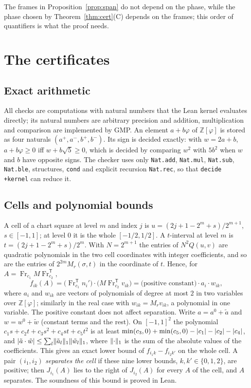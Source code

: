 \documentclass[11pt]{article}
\theoremstyle{definition}
\theoremstyle{remark}
\newcommand{\Z}{\mathbb{Z}}
\newcommand{\Fr}{\operatorname{Fr}}
\newcommand{\T}{\mathsf T}
\DeclarePairedDelimiter{\abs}{\lvert}{\rvert}
\DeclarePairedDelimiter{\norm}{\lVert}{\rVert}
\begin{document}
The frames in Proposition~\ref{prop:span} do not depend on the phase, while the phase chosen by
Theorem~\ref{thm:cert}(C) depends on the frames; this order of quantifiers is what the proof needs.

\section{The certificates}\label{sec:cert}

\subsection{Exact arithmetic}
All checks are computations with natural numbers that the Lean kernel evaluates directly; its
natural numbers are arbitrary precision and addition, multiplication and comparison are
implemented by GMP. An element $a+b\varphi$ of $\Z[\varphi]$ is stored as four naturals
$(a^+,a^-,b^+,b^-)$. Its sign is decided exactly: with $w=2a+b$, $a+b\varphi\ge0$ iff
$w+b\sqrt5\ge0$, which is decided by comparing $w^2$ with $5b^2$ when $w$ and $b$ have
opposite signs. The checker uses only \texttt{Nat.add}, \texttt{Nat.mul}, \texttt{Nat.sub},
\texttt{Nat.ble}, structures, \texttt{cond} and explicit recursion \texttt{Nat.rec}, so that
\texttt{decide +kernel} can reduce it.

\subsection{Cells and polynomial bounds}
A cell of a chart square at level $m$ and index $j$ is $u=(2j+1-2^m+s)/2^{m+1}$, $s\in[-1,1]$; at level
$0$ it is the whole $[-1/2,1/2]$. A $t$-interval at level $m$ is $t=(2j+1-2^m+s)/2^m$. With
$N=2^{m+1}$ the entries of $N^2Q(u,v)$ are quadratic polynomials in the two cell coordinates with
integer coefficients, and so are the entries of $2^{2m}M_r(\sigma,t)$ in the coordinate of $t$. Hence,
for $A=\Fr_{c_1}M\Fr_{c_2}^{\T}$,
\[
  f_{ik}(A)=\bigl(\Fr_{c_1}^{\T}n_i'\bigr)\cdot\bigl(M\Fr_{c_2}^{\T}v_{ik}\bigr)
  =\text{(positive constant)}\cdot a_i\cdot w_{ik},
\]
where $a_i$ and $w_{ik}$ are vectors of polynomials of degree at most $2$ in two variables over
$\Z[\varphi]$; similarly in the real case with $w_{ik}=M_rv_{ik}$, a polynomial in one variable. The
positive constant does not affect separation. Write $a=a^0+\tilde a$ and $w=w^0+\tilde w$ (constant
terms and the rest). On $[-1,1]^2$ the polynomial $c_1s+c_2t+c_3s^2+c_4st+c_5t^2$ is at least
$\min(c_3,0)+\min(c_5,0)-\abs{c_1}-\abs{c_2}-\abs{c_4}$, and
$\abs{\tilde a\cdot\tilde w}\le\sum_{l}\norm{\tilde a_l}_1\norm{\tilde w_l}_1$, where
$\norm{\cdot}_1$ is the sum of the absolute values of the coefficients. This gives an exact lower
bound of $f_{i_1k}-f_{i_2k'}$ on the whole cell. A pair $(i_1,i_2)$ \emph{separates the cell} if these
nine lower bounds, $k,k'\in\{0,1,2\}$, are positive; then $J_{i_1}(A)$ lies to the right of $J_{i_2}(A)$
for every $A$ of the cell, and $A$ separates. The soundness of this bound is proved in Lean.
\end{document}
